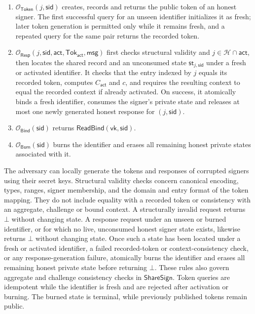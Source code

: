 \documentclass[lettersize,journal]{IEEEtran}
\begin{document}
\begin{enumerate}
\item $\mathcal O_{\mathsf{Token}}(j,\mathsf{sid})$ creates, records and
returns the public token of an honest signer. The first successful query
for an unseen identifier initializes it as fresh; later token generation
is permitted only while it remains fresh, and a repeated query for the
same pair returns the recorded token.

\item $\mathcal O_{\mathsf{Resp}}
(j,\mathsf{sid},\mathsf{act},\mathsf{Tok}_{\mathsf{act}},\mathsf{msg})$
first checks structural validity and $j\in\mathcal H\cap\mathsf{act}$,
then locates the shared record and an unconsumed state
$\mathsf{st}_{j,\mathsf{sid}}$ under a fresh or activated identifier.
It checks that the entry indexed by $j$ equals its recorded token,
computes $C_{\mathsf{act}}$ and $c$, and requires the resulting context
to equal the recorded context if already activated. On success, it
atomically binds a fresh identifier, consumes the signer's private state
and releases at most one newly generated honest response for
$(j,\mathsf{sid})$.

\item $\mathcal O_{\mathsf{Bind}}(\mathsf{sid})$ returns
$\mathsf{ReadBind}(\mathsf{vk},\mathsf{sid})$.

\item $\mathcal O_{\mathsf{Burn}}(\mathsf{sid})$ burns the identifier and
erases all remaining honest private states associated with it.
\end{enumerate}

The adversary can locally generate the tokens and responses of corrupted
signers using their secret keys. Structural validity checks concern
canonical encoding, types, ranges, signer membership, and the domain and
entry format of the token mapping. They do not include equality with a
recorded token or consistency with an aggregate, challenge or bound
context. A structurally invalid request returns $\bot$ without changing
state. A response request under an unseen or burned identifier, or for
which no live, unconsumed honest signer state exists, likewise returns
$\bot$ without changing state. Once such a state has been located under
a fresh or activated identifier, a failed recorded-token or
context-consistency check, or any response-generation failure,
atomically burns the identifier and erases all remaining honest private
state before returning $\bot$. These rules also govern aggregate and
challenge consistency checks in $\mathsf{ShareSign}$. Token queries are
idempotent while the identifier is fresh and are rejected after activation
or burning. The burned state is terminal, while previously published
tokens remain public.
\end{document}
